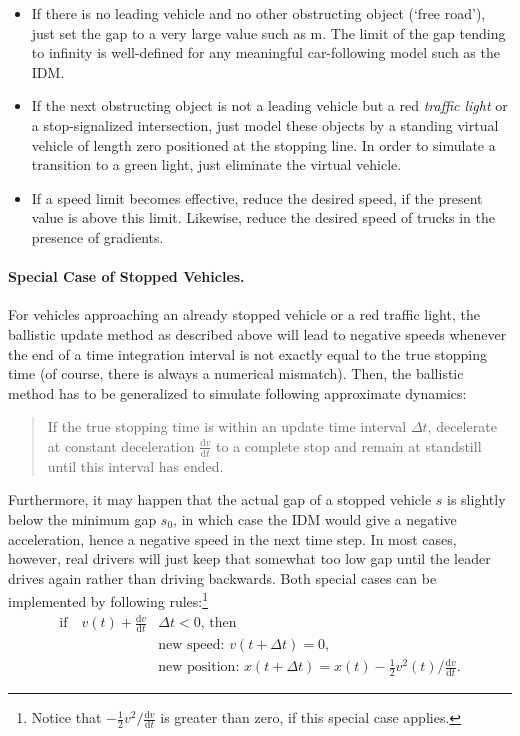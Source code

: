 \documentclass[paper=A4,pagesize=auto,11pt]{scrartcl}
\providecommand{\gquote}[1]{`#1'}
\newcommand{\D}{\text{d}}
\providecommand{\abl}[2] {\frac{\D #1}{\D #2}}
\begin{document}
\begin{itemize}
\item
If there is no leading vehicle and no other obstructing object
(\gquote{free road}), just set the gap to a very large value such as
\unit[1000]{m}. The limit of the gap tending to infinity is well-defined for
any meaningful car-following model such as the IDM. 
\item
If the next obstructing object is not a leading vehicle but a red \textit{traffic light} or a stop-signalized intersection, just model these objects by a standing virtual vehicle of length zero positioned at the stopping line. In order to simulate a transition to a green light, just eliminate the virtual vehicle.
\item
If a speed limit becomes effective, reduce the desired speed, if the present value is above this limit. Likewise, reduce the desired speed of trucks in the presence of gradients. 
\end{itemize}

\paragraph{Special Case of Stopped Vehicles.} 
For vehicles approaching an already stopped vehicle or a red traffic light, the ballistic update method as described above will lead to negative speeds whenever the end of a time integration interval is not exactly equal to the true stopping time (of course, there is always a numerical mismatch). Then, the ballistic method has to be generalized to simulate following approximate dynamics: 

\begin{quote}
If the true stopping time is within an update time interval $\Delta t$, decelerate at constant deceleration $\abl{v}{t}$ to a complete stop and remain at standstill until this interval has ended.
\end{quote}
%
Furthermore, it may happen that the actual gap of a stopped vehicle $s$ is slightly below the minimum gap $s_0$, in which case the IDM would give a negative acceleration, hence a negative speed in the next time step. In most cases, however, real drivers will just keep that somewhat too low gap until the leader drives again rather than driving backwards. Both special cases can be implemented by following rules:\footnote{Notice that $-\frac{1}{2} v^2 / \abl{v}{t}$ is greater than zero, if this special case applies.}
\begin{align}
\text{if}\quad v(t) + \abl{v}{t} & \Delta t < 0, \,\text{then}\\
& \text{new speed:}\,\,  	v(t+\Delta t)=0,\\
& \text{new position:}\,\,	x(t+\Delta t)= x(t) - \frac{1}{2} v^2 (t)/ \abl{v}{t}.
\end{align}
\end{document}
